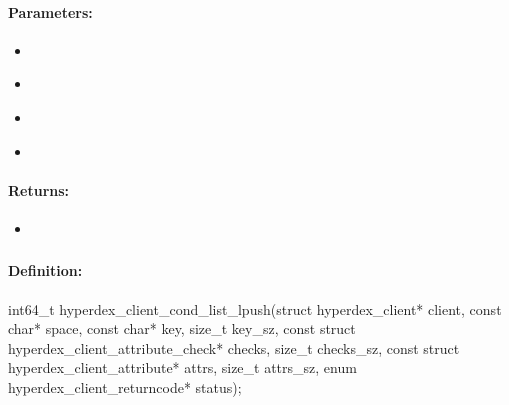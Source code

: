 \paragraph{Parameters:}
\begin{itemize}[noitemsep]
\item {}\\

\item {}\\

\item {}\\

\item {}\\

\end{itemize}

\paragraph{Returns:}
\begin{itemize}[noitemsep]
\item {}\\

\end{itemize}

\pagebreak
\subsubsection{}
\label{api:c:cond_list_lpush}


\paragraph{Definition:}
\begin{ccode}
int64_t hyperdex_client_cond_list_lpush(struct hyperdex_client* client,
        const char* space,
        const char* key, size_t key_sz,
        const struct hyperdex_client_attribute_check* checks, size_t checks_sz,
        const struct hyperdex_client_attribute* attrs, size_t attrs_sz,
        enum hyperdex_client_returncode* status);
\end{ccode}

